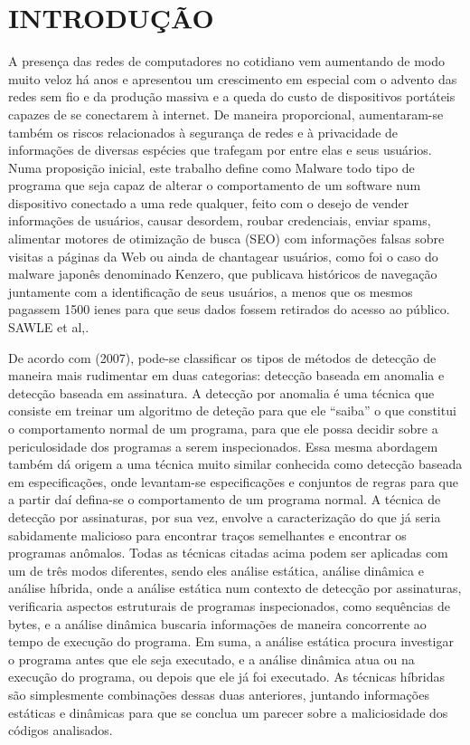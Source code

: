 \chapter{INTRODUÇÃO}
\label{c.introducao}

A presença das redes de computadores no cotidiano vem aumentando de modo muito
veloz há anos e apresentou um crescimento em especial com o advento das redes
sem fio e da produção massiva e a queda do custo de dispositivos portáteis
capazes de se conectarem à internet. De maneira proporcional, aumentaram-se
também os riscos relacionados à segurança de redes e à privacidade de
informações de diversas espécies que trafegam por entre elas e seus usuários.
Numa proposição inicial, este trabalho define como Malware todo tipo de
programa que seja capaz de alterar o comportamento de um software num
dispositivo conectado a uma rede qualquer, feito com o desejo de vender
informações de usuários, causar desordem, roubar credenciais, enviar spams,
alimentar motores de otimização de busca (SEO) com informações falsas sobre
visitas a páginas da Web ou ainda de chantagear usuários, como foi o caso do
malware japonês denominado Kenzero, que publicava históricos de navegação
juntamente com a identificação de seus usuários, a menos que os mesmos
pagassem 1500 ienes para que seus dados fossem retirados do acesso ao público.
SAWLE et al,\citeyear{sawle14}.

De acordo com \citeauthor{idika07} (2007), pode-se classificar os tipos de
métodos de detecção de maneira mais rudimentar em duas categorias: detecção
baseada em anomalia e detecção baseada em assinatura. A detecção por anomalia
é uma técnica que consiste em treinar um algoritmo de deteção para que ele
“saiba” o que constitui o comportamento normal de um programa, para que ele
possa decidir sobre a periculosidade dos programas a serem inspecionados. Essa
mesma abordagem também dá origem a uma técnica muito similar conhecida como
detecção baseada em especificações, onde levantam-se especificações e
conjuntos de regras para que a partir daí defina-se o comportamento de um
programa normal. A técnica de detecção por assinaturas, por sua vez, envolve a
caracterização do que já seria sabidamente malicioso para encontrar traços
semelhantes e encontrar os programas anômalos. Todas as técnicas citadas acima
podem ser aplicadas com um de três modos diferentes, sendo eles análise
estática, análise dinâmica e análise híbrida, onde a análise estática num
contexto de detecção por assinaturas, verificaria aspectos estruturais de
programas inspecionados, como sequências de bytes, e a análise dinâmica
buscaria informações de maneira concorrente ao tempo de execução do programa.
Em suma, a análise estática procura investigar o programa antes que ele seja
executado, e a análise dinâmica atua ou na execução do programa, ou depois que
ele já foi executado. As técnicas híbridas são simplesmente combinações dessas
duas anteriores, juntando informações estáticas e dinâmicas para que se
conclua um parecer sobre a maliciosidade dos códigos analisados.


